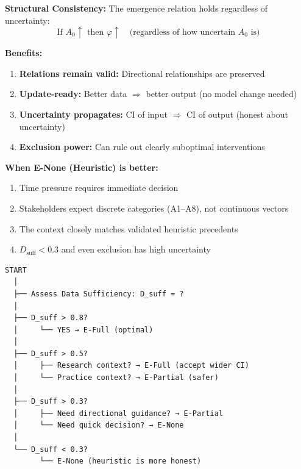 \begin{tcolorbox}[colback=green!5!white, colframe=green!75!black,
    title=\textbf{Why Use E-Full Even with $C < 0.7$?}]

\textbf{Structural Consistency:} The emergence relation holds regardless of uncertainty:
\begin{equation}
\text{If } A_0 \uparrow \text{ then } \varphi \uparrow \quad \text{(regardless of how uncertain } A_0 \text{ is)}
\end{equation}

\textbf{Benefits:}
\begin{enumerate}[nosep]
    \item \textbf{Relations remain valid:} Directional relationships are preserved
    \item \textbf{Update-ready:} Better data $\Rightarrow$ better output (no model change needed)
    \item \textbf{Uncertainty propagates:} CI of input $\Rightarrow$ CI of output (honest about uncertainty)
    \item \textbf{Exclusion power:} Can rule out clearly suboptimal interventions
\end{enumerate}

\textbf{When E-None (Heuristic) is better:}
\begin{enumerate}[nosep]
    \item Time pressure requires immediate decision
    \item Stakeholders expect discrete categories (A1--A8), not continuous vectors
    \item The context closely matches validated heuristic precedents
    \item $D_{\text{suff}} < 0.3$ and even exclusion has high uncertainty
\end{enumerate}
\end{tcolorbox}

\begin{tcolorbox}[colback=yellow!5!white, colframe=yellow!75!black,
    title=\textbf{Practical Decision Tree: Which Emergence Mode?}]

\begin{verbatim}
START
  │
  ├── Assess Data Sufficiency: D_suff = ?
  │
  ├── D_suff > 0.8?
  │     └── YES → E-Full (optimal)
  │
  ├── D_suff > 0.5?
  │     ├── Research context? → E-Full (accept wider CI)
  │     └── Practice context? → E-Partial (safer)
  │
  ├── D_suff > 0.3?
  │     ├── Need directional guidance? → E-Partial
  │     └── Need quick decision? → E-None
  │
  └── D_suff < 0.3?
        └── E-None (heuristic is more honest)
\end{verbatim}
\end{tcolorbox}



